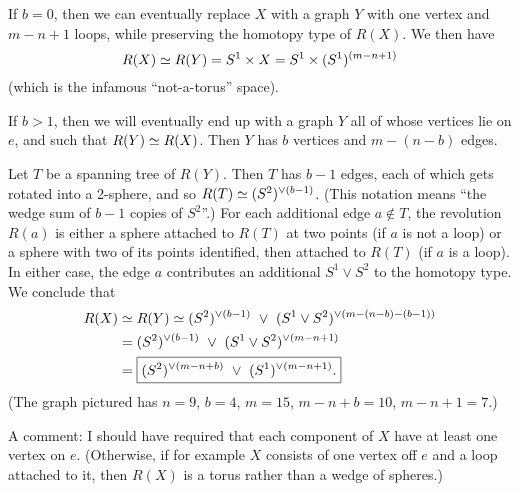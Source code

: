 If $b=0$, then we can eventually replace $X$ with a graph $Y$ with one vertex and $m-n+1$ loops, while preserving the homotopy type of $R(X)$.  We then have
\[R(X) \simeq R(Y) = S^1\times X = S^1 \times (S^1)^{(m-n+1)}\]
(which is the infamous ``not-a-torus'' space).

If $b>1$, then we will eventually end up with a graph $Y$ all of whose vertices lie on $e$,
and such that $R(Y)\simeq R(X)$.
Then $Y$ has $b$ vertices and $m-(n-b)$ edges.

Let $T$ be a spanning tree of $R(Y)$.  Then $T$ has $b-1$ edges, each of which gets rotated into
a 2-sphere, and so $R(T)\simeq (S^2)^{\vee(b-1)}$.  (This notation means
``the wedge sum of $b-1$ copies of $S^2$''.)  For each
additional edge $a\not\in T$, the revolution $R(a)$ is either a sphere attached to $R(T)$ at two points
(if $a$ is not a loop) or a sphere with two of its points identified, then attached to $R(T)$ (if $a$
is a loop).  In either case, the edge $a$ contributes an additional $S^1\vee S^2$ to the homotopy type.
We conclude that
\begin{align*}
R(X) &\simeq R(Y) \simeq (S^2)^{\vee(b-1)} ~\vee~ (S^1\vee S^2)^{\vee(m-(n-b)-(b-1))}\\
  &= (S^2)^{\vee(b-1)} ~\vee~ (S^1\vee S^2)^{\vee(m-n+1)}\\
  &= \boxed{(S^2)^{\vee(m-n+b)} ~\vee~ (S^1)^{\vee(m-n+1)}.}
\end{align*}
(The graph pictured has
 $n=9$, $b=4$, $m=15$, $m-n+b=10$, $m-n+1=7$.)

A comment: I should have required that each component of $X$ have at least one vertex on $e$.  (Otherwise, if for example $X$ consists of one vertex off $e$ and a loop attached to it, then $R(X)$ is a torus rather than a wedge of spheres.)




